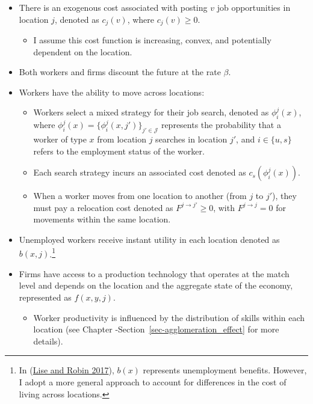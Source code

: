 \documentclass[
  letterpaper,
  DIV=11,
  numbers=noendperiod]{scrreprt}
\providecommand{\tightlist}{%
  \setlength{\itemsep}{0pt}\setlength{\parskip}{0pt}}\usepackage{longtable,booktabs,array}
\begin{document}
\begin{itemize}
\tightlist
\item
  There is an exogenous cost associated with posting \(v\) job
  opportunities in location \(j\), denoted as \(c_{j}(v)\), where
  \(c_{j}(v) \geq 0\).

  \begin{itemize}
  \tightlist
  \item
    I assume this cost function is increasing, convex, and potentially
    dependent on the location.
  \end{itemize}
\item
  Both workers and firms discount the future at the rate \(\beta\).
\item
  Workers have the ability to move across locations:

  \begin{itemize}
  \tightlist
  \item
    Workers select a mixed strategy for their job search, denoted as
    \(\phi^j_i(x)\), where
    \(\phi^j_i(x) = \{\phi^j_i(x, j')\}_{j' \in \mathcal{J}}\)
    represents the probability that a worker of type \(x\) from location
    \(j\) searches in location \(j'\), and \(i \in \{u,s\}\) refers to
    the employment status of the worker.
  \item
    Each search strategy incurs an associated cost denoted as
    \(c_s(\phi_i^j(x))\).
  \item
    When a worker moves from one location to another (from \(j\) to
    \(j'\)), they must pay a relocation cost denoted as
    \(F^{j \to j'} \geq 0\), with \(F^{j \to j} = 0\) for movements
    within the same location.
  \end{itemize}
\item
  Unemployed workers receive instant utility in each location denoted as
  \(b(x,j)\).\footnote{In
    (\protect\hyperlink{ref-liseMacrodynamicsSortingWorkers2017}{Lise
    and Robin 2017}), \(b(x)\) represents unemployment benefits.
    However, I adopt a more general approach to account for differences
    in the cost of living across locations.}
\item
  Firms have access to a production technology that operates at the
  match level and depends on the location and the aggregate state of the
  economy, represented as \(f(x, y, j)\).

  \begin{itemize}
  \tightlist
  \item
    Worker productivity is influenced by the distribution of skills
    within each location (see Chapter
    -Section~\ref{sec-agglomeration_effect} for more details).
  \end{itemize}
\end{itemize}
\end{document}
